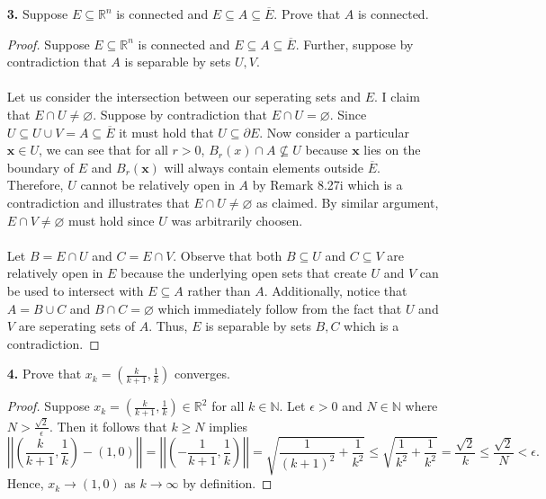 \documentclass[ 12pt ]{article}
\begin{document}
\begin{enumerate}
\begin{proof}
\begin{enumerate}
				\item[\textbf{b.}] Similarly, notice that $\overline{B}$ is closed by definition and Theorem 8.24. Hence, Theorem 8.32iii states that $\overline{A} \subseteq \overline{B}$.
			\end{enumerate}
		\end{proof}


	\item[\textbf{3.}] Suppose $E \subseteq \mathbb{R}^n$ is connected and $E \subseteq A \subseteq \overline{E}$. Prove that $A$ is connected.

		\begin{proof}
			Suppose $E \subseteq \mathbb{R}^n$ is connected and $E \subseteq A \subseteq \overline{E}$. Further, suppose by contradiction that $A$ is separable by sets $U, V$. \\ \\
			Let us consider the intersection between our seperating sets and $E$. I claim that $E \cap U \neq \varnothing$. Suppose by contradiction that $E \cap U = \varnothing$.
			Since $U \subseteq U \cup V = A \subseteq \overline{E}$ it must hold that $U \subseteq \partial E$. Now consider a particular $\textbf{x} \in U$, we can see that for all
			$r > 0$, $B_r(x) \cap A \nsubseteq U$ because $\textbf{x}$ lies on the boundary of $E$ and $B_r(\textbf{x})$ will always contain elements outside $\overline{E}$. Therefore,
			$U$ cannot be relatively open in $A$ by Remark 8.27i which is a contradiction and illustrates that $E \cap U \neq \varnothing$ as claimed. By similar argument, $E \cap V \neq
			\varnothing$ must hold since $U$ was arbitrarily choosen. \\ \\
			Let $B = E \cap U$ and $C = E \cap V$. Observe that both $B \subseteq U$ and $C \subseteq V$ are relatively open
			in $E$ because the underlying open sets that create $U$ and $V$ can be used to intersect with $E \subseteq A$ rather than $A$. Additionally, notice that $A = B \cup C$ and
			$B \cap C = \varnothing$ which immediately follow from the fact that $U$ and $V$ are seperating sets of $A$. Thus, $E$ is separable by sets $B, C$ which is a
			contradiction.
		\end{proof}


	\item[\textbf{4.}] Prove that $x_k = \left( \frac{k}{k+1}, \frac{1}{k} \right)$ converges.

		\begin{proof}
			Suppose $x_k = \left( \frac{k}{k+1}, \frac{1}{k} \right) \in \mathbb{R}^2$ for all $k \in \mathbb{N}$. Let $\epsilon > 0$ and $N \in \mathbb{N}$ where $N >
			\frac{\sqrt{2}}{\epsilon}$. Then it follows that $k \geq N$ implies $$\left | \left | \left( \frac{k}{k+1}, \frac{1}{k} \right) - (1, 0) \right | \right | =
			\left | \left | \left( -\frac{1}{k+1}, \frac{1}{k} \right) \right | \right | = \sqrt{ \frac{1}{(k+1)^2} + \frac{1}{k^2} } \leq \sqrt{ \frac{1}{k^2} + \frac{1}{k^2} } =
			\frac{\sqrt{2}}{k} \leq \frac{\sqrt{2}}{N} < \epsilon.$$ Hence, $x_k \to (1, 0)$ as $k \to \infty$ by definition.
		\end{proof}

\end{enumerate}
\end{document}
